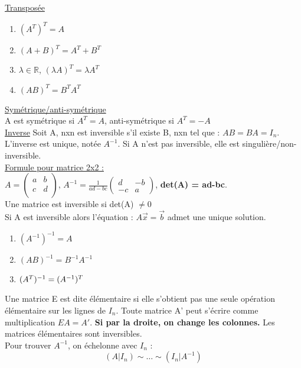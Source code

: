 \documentclass[../main.tex]{subfiles}
\begin{document}
\quad \underline{Transposée}
\begin{enumerate}
    \item $(A^T)^T = A$\\
    \item $(A+B)^T = A^T + B^T$\\
    \item $\lambda \in \mathbb{R}$, $(\lambda A)^T = \lambda A^T$\\
    \item $(AB)^T = B^TA^T$\\
\end{enumerate}


\quad \underline{Symétrique/anti-symétrique}\\
A est symétrique si $A^T = A$, anti-symétrique si $A^T = -A$\\

\quad \underline{Inverse}
Soit A, nxn est inversible s'il existe B, nxn tel que : $AB = BA = I_n$. L'inverse est unique, notée $A^{-1}$. Si A n'est pas inversible, elle est singulière/non-inversible.\\

\quad \underline{Formule pour matrice 2x2 :}\\
$A = \begin{pmatrix}
    a & b\\
    c & d\\
\end{pmatrix}$, $A^{-1} = \frac{1}{ad-bc} \begin{pmatrix}
    d & -b\\
    -c & a
\end{pmatrix}$, \textbf{det(A) = ad-bc}.\\
Une matrice est inversible si det(A) $\neq 0$\\

Si A est inversible alors l'équation : $A \vec{x} = \vec{b}$ admet une unique solution. \\
\begin{enumerate}
    \item $(A^{-1})^{-1} = A$\\
    \item $(AB)^{-1} = B^{-1} A^{-1}$\\
    \item $(A^T)^{-1} = (A^{-1})^T\\$
\end{enumerate}

Une matrice E est dite élémentaire si elle s'obtient pas une seule opération élémentaire sur les lignes de $I_n$. Toute matrice A' peut s'écrire comme multiplication $EA = A'$. \textbf{Si par la droite, on change les colonnes.} Les matrices élémentaires sont inversibles. \\
Pour trouver $A^{-1}$, on échelonne avec $I_n$ :
\begin{equation}
    (A|I_n) \sim \dots \sim (I_n| A^{-1})
\end{equation}
\end{document}
